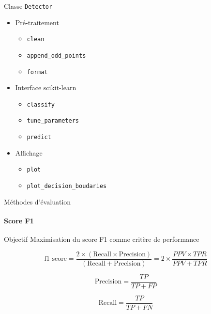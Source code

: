 \documentclass{beamer}
\begin{document}
\begin{frame}{Classe \texttt{Detector}}
\begin{itemize}
\item Pré-traitement \begin{itemize}
\item \texttt{clean}
\item \texttt{append\_odd\_points}
\item \texttt{format}
\end{itemize}
\item Interface scikit-learn \begin{itemize}
\item \texttt{classify}
\item \texttt{tune\_parameters}
\item \texttt{predict}
\end{itemize}
\item Affichage \begin{itemize}
\item \texttt{plot}
\item  \texttt{plot\_decision\_boudaries}
\end{itemize}
\end{itemize}
\end{frame}

\begin{frame}{Méthodes d'évaluation}
\framesubtitle{Score F1}

\begin{block}{Objectif}
Maximisation du score F1 comme critère de performance
\end{block}

\begin{equation}
\text{f1-score} = \dfrac{2\times(\text{Recall} \times \text{Precision})}{(\text{Recall} + \text{Precision})} = 2\times\dfrac{PPV \times TPR}{PPV + TPR}
\end{equation}

\begin{equation}
\text{Precision} = \dfrac{TP}{TP+FP}
\end{equation}

\begin{equation}
\text{Recall} = \dfrac{TP}{TP+FN}
\end{equation}

\end{frame}
\end{document}
